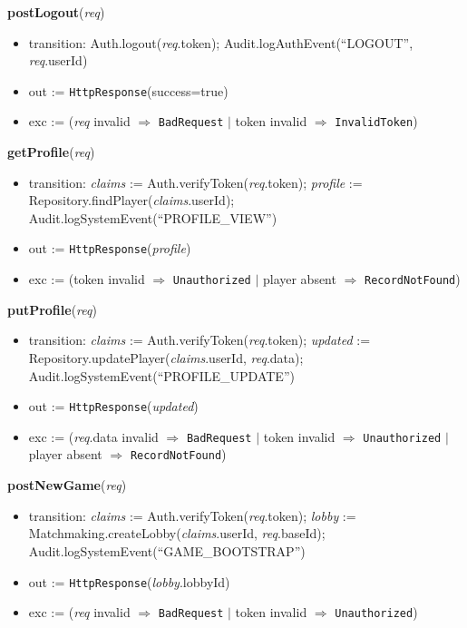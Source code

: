 \documentclass[12pt, titlepage]{article}
\begin{document}
\noindent\textbf{postLogout}(\textit{req})
\begin{itemize}
    \item transition: Auth.logout(\textit{req}.token); Audit.logAuthEvent(``LOGOUT'', \textit{req}.userId)
    \item out := \texttt{HttpResponse}(success=true)
    \item exc := (\textit{req} invalid $\Rightarrow$ \texttt{BadRequest} $|$ token invalid $\Rightarrow$ \texttt{InvalidToken})
\end{itemize}

\noindent\textbf{getProfile}(\textit{req})
\begin{itemize}
    \item transition: \textit{claims} := Auth.verifyToken(\textit{req}.token); \textit{profile} := Repository.findPlayer(\textit{claims}.userId); Audit.logSystemEvent(``PROFILE\_VIEW'')
    \item out := \texttt{HttpResponse}(\textit{profile})
    \item exc := (token invalid $\Rightarrow$ \texttt{Unauthorized} $|$ player absent $\Rightarrow$ \texttt{RecordNotFound})
\end{itemize}

\noindent\textbf{putProfile}(\textit{req})
\begin{itemize}
    \item transition: \textit{claims} := Auth.verifyToken(\textit{req}.token); \textit{updated} := Repository.updatePlayer(\textit{claims}.userId, \textit{req}.data); Audit.logSystemEvent(``PROFILE\_UPDATE'')
    \item out := \texttt{HttpResponse}(\textit{updated})
    \item exc := (\textit{req}.data invalid $\Rightarrow$ \texttt{BadRequest} $|$ token invalid $\Rightarrow$ \texttt{Unauthorized} $|$ player absent $\Rightarrow$ \texttt{RecordNotFound})
\end{itemize}

\noindent\textbf{postNewGame}(\textit{req})
\begin{itemize}
    \item transition: \textit{claims} := Auth.verifyToken(\textit{req}.token); \textit{lobby} := Matchmaking.createLobby(\textit{claims}.userId, \textit{req}.baseId); Audit.logSystemEvent(``GAME\_BOOTSTRAP'')
    \item out := \texttt{HttpResponse}(\textit{lobby}.lobbyId)
    \item exc := (\textit{req} invalid $\Rightarrow$ \texttt{BadRequest} $|$ token invalid $\Rightarrow$ \texttt{Unauthorized})
\end{itemize}
\end{document}
